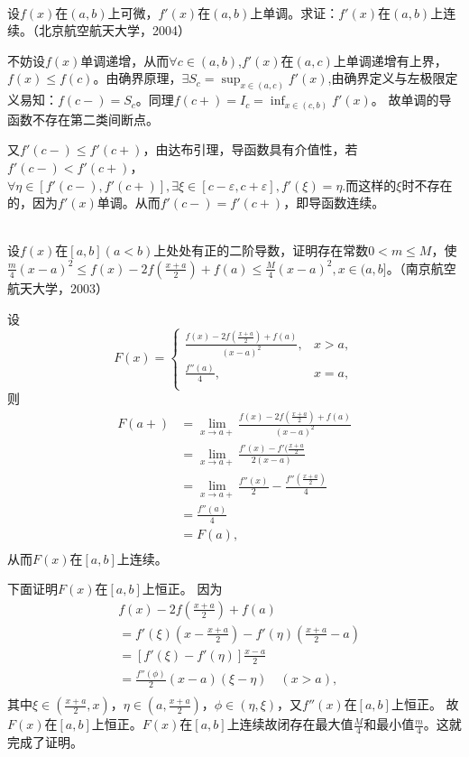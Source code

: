   \begin{example}
  \hfill\\
   设$f(x)$在$(a,b)$上可微，$f'(x)$在$(a,b)$上单调。求证：$f'(x)$在$(a,b)$上连续。（北京航空航天大学，2004）
  
  不妨设$f(x)$单调递增，从而$\forall c\in(a,b)$,$f'(x)$在$(a,c)$上单调递增有上界，$f(x)\leq f(c)$。由确界原理，$\exists S_c=\sup_{x\in(a,c)}f'(x)$,由确界定义与左极限定义易知：$f(c-)=S_c$。同理$f(c+)=I_c=\inf_{x\in(c,b)}f'(x)$。
  故单调的导函数不存在第二类间断点。
  
  又$f'(c-)\leq f'(c+)$，由达布引理，导函数具有介值性，若$f'(c-)<f'(c+)$，$\forall\eta\in[f'(c-),f'(c+)],\exists\xi\in[c-\varepsilon,c+\varepsilon],f'(\xi)=\eta.$而这样的$\xi$时不存在的，因为$f'(x)$单调。从而$f'(c-)=f'(c+)$，即导函数连续。
  \end{example}
  \begin{exercise}
  \hfill\\
 设$f(x)$在$[a,b](a<b)$上处处有正的二阶导数，证明存在常数$0<m\leq M$，使$\frac m4(x-a)^2\leq f(x)-2f(\frac{x+a}2)+f(a)\leq \frac M4(x-a)^2,x\in(a,b]$。（南京航空航天大学，2003） 
  
  设$$F(x)=
  \begin{cases}
  \frac{f(x)-2f(\frac{x+a}{2})+f(a)}{(x-a)^2},&x>a,\\
  \frac{f''(a)}{4},&x=a,\\
  \end{cases}
  $$
  则
  \begin{align*}
  F(a+)&=\lim_{x\rightarrow a+}\frac{f(x)-2f(\frac{x+a}{2})+f(a)}{(x-a)^2}\\
  &=\lim_{x\rightarrow a+}\frac{f'(x)-f'(\frac{x+a}{2}}{2(x-a)}\\
  &=\lim_{x\rightarrow a+}\frac{f''(x)}{2}-\frac{f''(\frac{x+a}{2})}{4}\\
  &=\frac{f''(a)}{4}\\
  &=F(a),\\
  \end{align*}
  从而$F(x)$在$[a,b]$上连续。
  
  下面证明$F(x)$在$[a,b]$上恒正。
 因为
 \begin{align*}
 &f(x)-2f(\frac{x+a}{2})+f(a)\\
 &=f'(\xi)(x-\frac{x+a}{2})-f'(\eta)(\frac{x+a}{2}-a)\\
 &=[f'(\xi)-f'(\eta)]\frac{x-a}{2}\\
 &=\frac{f''(\phi)}2(x-a)(\xi-\eta)\quad(x>a),\\
 \end{align*}
 其中$\xi\in(\frac{x+a}{2},x)$，$\eta\in(a,\frac{x+a}{2})$，$\phi\in(\eta,\xi)$，又$f''(x)$在$[a,b]$上恒正。
 故$F(x)$在$[a,b]$上恒正。$F(x)$在$[a,b]$上连续故闭存在最大值$\frac{M}{4}$和最小值$\frac{m}{4}$。这就完成了证明。  
  \end{exercise}  
  
